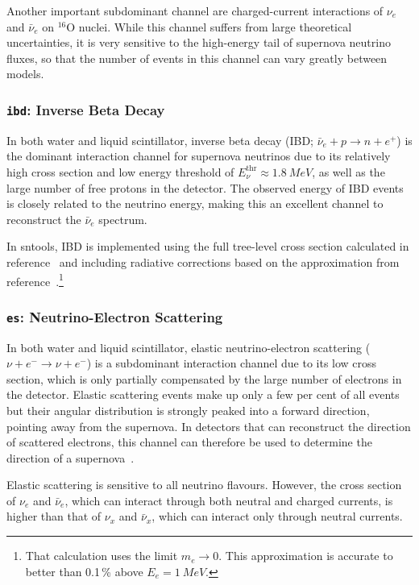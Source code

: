 \documentclass[11pt, oneside]{article}
\newcommand{\nue}{\ensuremath{\nu_e}\xspace}
\newcommand{\nux}{\ensuremath{\nu_x}\xspace}
\newcommand{\nuebar}{\ensuremath{\bar{\nu}_e}\xspace}
\newcommand{\nuxbar}{\ensuremath{\bar{\nu}_x}\xspace}
\begin{document}
Another important subdominant channel are charged-current interactions of \nue and \nuebar on $^{16}$O nuclei.
While this channel suffers from large theoretical uncertainties, it is very sensitive to the high-energy tail of supernova neutrino fluxes, so that the number of events in this channel can vary greatly between models.


\subsubsection{\texttt{ibd}: Inverse Beta Decay}
In both water and liquid scintillator, inverse beta decay (IBD; $\nuebar + p \rightarrow n + e^+$) is the dominant interaction channel for supernova neutrinos due to its relatively high cross section and low energy threshold of $E_\nu^\text{thr} \approx \SI{1.8}{MeV}$, as well as the large number of free protons in the detector.
The observed energy of IBD events is closely related to the neutrino energy, making this an excellent channel to reconstruct the \nuebar spectrum.

In sntools, IBD is implemented using the full tree-level cross section calculated in reference~\cite{Strumia2003} and including radiative corrections based on the approximation from reference~\cite{Kurylov2003}.\footnote{That calculation uses the limit $m_e \rightarrow 0$. This approximation is accurate to better than 0.1\,\% above $E_e = \SI{1}{MeV}$.}


\subsubsection{\texttt{es}: Neutrino-Electron Scattering}
In both water and liquid scintillator, elastic neutrino-electron scattering  ($\nu + e^- \rightarrow \nu + e^-$) is a subdominant interaction channel due to its low cross section, which is only partially compensated by the large number of electrons in the detector.
Elastic scattering events make up only a few per cent of all events but their angular distribution is strongly peaked into a forward direction, pointing away from the supernova.
In detectors that can reconstruct the direction of scattered electrons, this channel can therefore be used to determine the direction of a supernova~\cite{Abe2016,HKDR2018}.

Elastic scattering is sensitive to all neutrino flavours.
However, the cross section of \nue and \nuebar, which can interact through both neutral and charged currents, is higher than that of \nux and \nuxbar, which can interact only through neutral currents.
\end{document}
